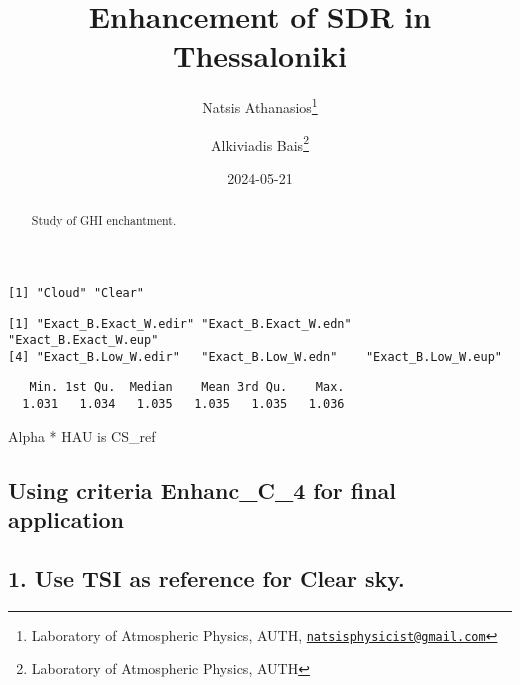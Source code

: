 \documentclass[
  10pt,
  a4paper,oneside]{article}
\title{Enhancement of SDR in Thessaloniki}
\author{Natsis Athanasios\footnote{Laboratory of Atmospheric Physics, AUTH, \href{mailto:natsisphysicist@gmail.com}{\nolinkurl{natsisphysicist@gmail.com}}} \and Alkiviadis Bais\footnote{Laboratory of Atmospheric Physics, AUTH}}
\date{2024-05-21}
\begin{document}
\maketitle
\begin{abstract}
Study of GHI enchantment.
\end{abstract}

{
\hypersetup{linkcolor=}
\setcounter{tocdepth}{4}
\tableofcontents
}
\begin{verbatim}
[1] "Cloud" "Clear"
\end{verbatim}

\begin{verbatim}
[1] "Exact_B.Exact_W.edir" "Exact_B.Exact_W.edn"  "Exact_B.Exact_W.eup" 
[4] "Exact_B.Low_W.edir"   "Exact_B.Low_W.edn"    "Exact_B.Low_W.eup"   
\end{verbatim}

\begin{verbatim}
   Min. 1st Qu.  Median    Mean 3rd Qu.    Max. 
  1.031   1.034   1.035   1.035   1.035   1.036 
\end{verbatim}

Alpha * HAU is CS\_ref

\hypertarget{using-criteria-enhanc_c_4-for-final-application}{%
\subsection{\texorpdfstring{Using criteria \textbf{Enhanc\_C\_4} for final application}{Using criteria Enhanc\_C\_4 for final application}}\label{using-criteria-enhanc_c_4-for-final-application}}

\hypertarget{use-tsi-as-reference-for-clear-sky.}{%
\subsection{1. Use TSI as reference for Clear sky.}\label{use-tsi-as-reference-for-clear-sky.}}
\end{document}
